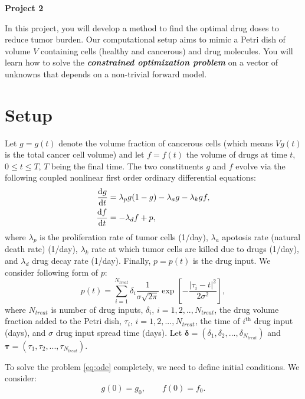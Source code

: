\documentclass[11pt,a4paper]{article}
\newcommand{\dd}{\mathrm{d}}
\newcommand{\bolds}[1]{\boldsymbol{#1}}
\newcommand{\bfit}[1]{\textit{\textbf{#1}}}
\begin{document}
\begin{center} 
\textbf{\Large Project 2} 
\end{center}

In this project, you will develop a method to find the optimal drug doses to reduce tumor burden. Our computational setup aims to mimic a Petri dish of volume $V$ containing cells (healthy and cancerous) and drug molecules. You will learn how to solve the \bfit{constrained optimization problem} on a vector of unknowns that depends on a non-trivial forward model. 

\section{Setup}
Let $g = g(t)$ denote the volume fraction of cancerous cells (which means $V g(t)$ is the total cancer cell volume) and let $f = f(t)$ the volume of drugs at time $t$, $0\leq t \leq T$, $T$ being the final time. The two constituents $g$ and $f$ evolve via the following coupled nonlinear first order ordinary differential equations:
\begin{align}\label{eq:ode}
\frac{\dd g}{\dd t} &= \lambda_p g (1 - g) - \lambda_a g - \lambda_k g f, \notag \\
\frac{\dd f}{\dd t} &= -\lambda_d f + p,
\end{align}
where $\lambda_p$ is the proliferation rate of tumor cells (1/day), $\lambda_a$ apotosis rate (natural death rate) (1/day), $\lambda_k$ rate at which tumor cells are killed due to drugs (1/day), and $\lambda_d$ drug decay rate (1/day). Finally, $p = p(t)$ is the drug input. We consider following form of $p$:
\begin{equation}\label{eq:drugInput}
p(t) = \sum_{i=1}^{N_{treat}} \delta_i \frac{1}{\sigma \sqrt{2\pi}} \exp\left[ -\frac{|\tau_i - t|^2}{2\sigma^2}\right],
\end{equation}
where $N_{treat}$ is number of drug inputs, $\delta_i$, $i=1,2, .., N_{treat}$, the drug volume fraction added to the Petri dish, $\tau_i$, $i=1,2,..., N_{treat}$, the time of $i^{\text{th}}$ drug input (days), and $\sigma$ drug input spread time (days). Let $\bolds{\delta} = (\delta_1, \delta_2, ..., \delta_{N_{treat}})$ and $\bolds{\tau} = (\tau_1, \tau_2, ..., \tau_{N_{treat}})$.

To solve the problem \eqref{eq:ode} completely, we need to define initial conditions. We consider:
\begin{equation}\label{eq:ic}
g(0) = g_0, \qquad f(0) = f_0 .
\end{equation}
\end{document}
